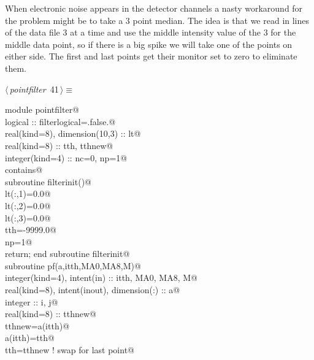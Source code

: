 \documentclass[10pt,a4paper,notitlepage]{article}
\begin{document}
When electronic noise appears in the detector channels a nasty workaround
for the problem might be to take a 3 point median. The idea is that we
read in lines of the data file 3 at a time and use the middle intensity value 
of the 3 for the middle data point, so if there is a big spike we will take
one of the points on either side. The first and last points get their 
monitor set to zero to eliminate them.
\begin{flushleft} \small
\begin{minipage}{\linewidth}\label{scrap45}\raggedright\small
{} $\langle\,${\it pointfilter}\nobreak\ {\footnotesize {41}}$\,\rangle\equiv$
\vspace{-1ex}
\begin{list}{}{} \item
\mbox{}\verb@      module pointfilter@\\
\mbox{}\verb@      logical :: filterlogical=.false.@\\
\mbox{}\verb@      real(kind=8), dimension(10,3) :: lt@\\
\mbox{}\verb@      real(kind=8) :: tth, tthnew@\\
\mbox{}\verb@      integer(kind=4) :: nc=0, np=1@\\
\mbox{}\verb@      contains@\\
\mbox{}\verb@      subroutine filterinit()@\\
\mbox{}\verb@      lt(:,1)=0.0@\\
\mbox{}\verb@      lt(:,2)=0.0@\\
\mbox{}\verb@      lt(:,3)=0.0@\\
\mbox{}\verb@      tth=-9999.0@\\
\mbox{}\verb@      np=1@\\
\mbox{}\verb@      return; end subroutine filterinit@\\
\mbox{}\verb@      subroutine pf(a,itth,MA0,MA8,M)@\\
\mbox{}\verb@      integer(kind=4), intent(in) :: itth, MA0, MA8, M@\\
\mbox{}\verb@      real(kind=8), intent(inout), dimension(:) :: a@\\
\mbox{}\verb@      integer :: i, j@\\
\mbox{}\verb@      real(kind=8) :: tthnew@\\
\mbox{}\verb@      tthnew=a(itth)@\\
\mbox{}\verb@      a(itth)=tth@\\
\mbox{}\verb@      tth=tthnew ! swap for last point@\\

\end{list}
\end{minipage}
\end{flushleft}
\end{document}
